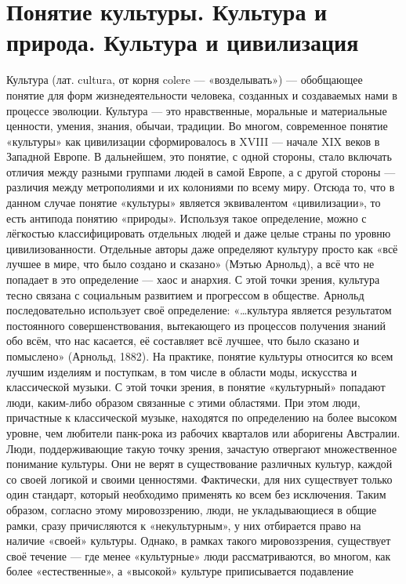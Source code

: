 \documentclass[12pt]{article}
\begin{document}
\section{Понятие культуры. Культура и природа. Культура и цивилизация}
Культура (лат. cultura, от корня colere — «возделывать») — обобщающее понятие для форм жизнедеятельности
человека, созданных и создаваемых нами в процессе эволюции. Культура — это нравственные, моральные и
материальные ценности, умения, знания, обычаи, традиции. 
Во многом, современное понятие «культуры» как цивилизации сформировалось в XVIII — начале XIX веков в
Западной Европе. В дальнейшем, это понятие, с одной стороны, стало включать отличия между разными
группами людей в самой Европе, а с другой стороны — различия между метрополиями и их колониями по
всему миру. Отсюда то, что в данном случае понятие «культуры» является эквивалентом «цивилизации», то есть
антипода понятию «природы». Используя такое определение, можно с лёгкостью классифицировать отдельных
людей и даже целые страны по уровню цивилизованности. Отдельные авторы даже определяют культуру просто
как «всё лучшее в мире, что было создано и сказано» (Мэтью Арнольд), а всё что не попадает в это определение
— хаос и анархия. С этой точки зрения, культура тесно связана с социальным развитием и прогрессом в
обществе. Арнольд последовательно использует своё определение: «…культура является результатом
постоянного совершенствования, вытекающего из процессов получения знаний обо всём, что нас касается, её
составляет всё лучшее, что было сказано и помыслено» (Арнольд, 1882).
На практике, понятие культуры относится ко всем лучшим изделиям и поступкам, в том числе в области моды,
искусства и классической музыки. С этой точки зрения, в понятие «культурный» попадают люди, каким-либо
образом связанные с этими областями. При этом люди, причастные к классической музыке, находятся по
определению на более высоком уровне, чем любители панк-рока из рабочих кварталов или аборигены
Австралии.
Люди, поддерживающие такую точку зрения, зачастую отвергают множественное понимание культуры. Они не
верят в существование различных культур, каждой со своей логикой и своими ценностями. Фактически, для них
существует только один стандарт, который необходимо применять ко всем без исключения. Таким образом,
согласно этому мировоззрению, люди, не укладывающиеся в общие рамки, сразу причисляются к
«некультурным», у них отбирается право на наличие «своей» культуры.
Однако, в рамках такого мировоззрения, существует своё течение — где менее «культурные» люди
рассматриваются, во многом, как более «естественные», а «высокой» культуре приписывается подавление
\end{document}
